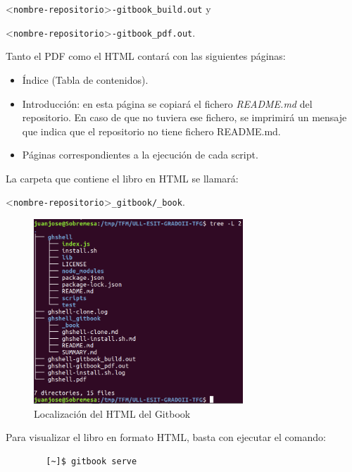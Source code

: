 \begin{itemize}
	\textless \verb|nombre-repositorio|\textgreater \verb|-gitbook_build.out| y 
\bigskip
	
	\textless \verb|nombre-repositorio|\textgreater \verb|-gitbook_pdf.out|.
	\bigskip
	\bigskip
	
	Tanto el PDF como el HTML contará con las siguientes páginas:
		
		\begin{itemize}
			\item Índice (Tabla de contenidos).
			\item Introducción: en esta página se copiará el fichero {\it README.md} del repositorio. En caso de que no tuviera ese fichero, se imprimirá un mensaje que indica que el repositorio no tiene fichero README.md.
			\item Páginas correspondientes a la ejecución de cada script.
		\end{itemize}
		
		
    La carpeta que contiene el libro en HTML se llamará:
    \bigskip
     
	\textless \verb|nombre-repositorio|\textgreater \verb|_gitbook/_book|. 
		
		\begin{figure}[H]
		\begin{center}
		\includegraphics[width=0.7\textwidth]{images/ghshell8-4}
		\caption{Localización del HTML del Gitbook}
		\label{fig:ghshell8-4}
		\end{center}
		\end{figure}

\bigskip

	Para visualizar el libro en formato HTML, basta con ejecutar el comando:
	
	\begin{verbatim}
		[~]$ gitbook serve
	\end{verbatim}
	

\end{itemize}
